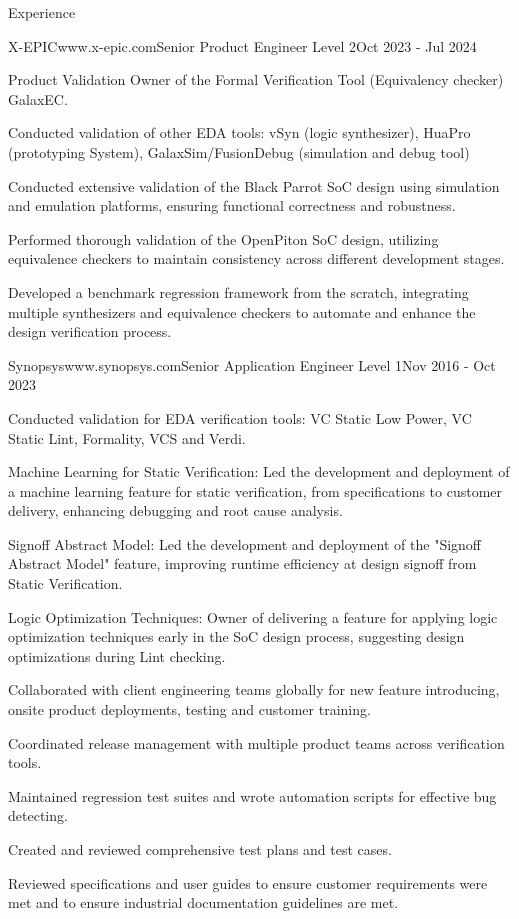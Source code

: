 \documentclass[
11pt, %
]{./assets/resume} %
\begin{document}
\begin{rSection}{Experience}
	\begin{rSubsectionX}{X-EPIC}{www.x-epic.com}{Senior Product Engineer Level 2}{Oct 2023 - Jul 2024}
		\item Product Validation Owner of the Formal Verification Tool (Equivalency checker) GalaxEC.
		\item Conducted validation of other EDA tools: vSyn (logic synthesizer), HuaPro (prototyping System), GalaxSim/FusionDebug (simulation and debug tool)
		\item Conducted extensive validation of the Black Parrot SoC design using simulation and emulation platforms, ensuring functional correctness and robustness.
		\item Performed thorough validation of the OpenPiton SoC design, utilizing equivalence checkers to maintain consistency across different development stages.
		\item Developed a benchmark regression framework from the scratch, integrating multiple synthesizers and equivalence checkers to automate and enhance the design verification process.
	\end{rSubsectionX}
	\begin{rSubsectionX}{Synopsys}{www.synopsys.com}{Senior Application Engineer Level 1}{Nov 2016 - Oct 2023}
		\item Conducted validation for EDA verification tools: VC Static Low Power, VC Static Lint, Formality, VCS and Verdi.
		\item Machine Learning for Static Verification: Led the development and deployment of a machine learning feature for static verification, from specifications to customer delivery, enhancing debugging and root cause analysis.
		\item Signoff Abstract Model: Led the development and deployment of the "Signoff Abstract Model" feature, improving runtime efficiency at design signoff from Static Verification.
		\item Logic Optimization Techniques: Owner of delivering a feature for applying logic optimization techniques early in the SoC design process, suggesting design optimizations during Lint checking.
		\item Collaborated with client engineering teams globally for new feature introducing, onsite product deployments, testing and customer training. 
		\item Coordinated release management with multiple product teams across verification tools. 
		\item Maintained regression test suites and wrote automation scripts for effective bug detecting.
		\item Created and reviewed comprehensive test plans and test cases.
		\item Reviewed specifications and user guides to ensure customer requirements were met and to ensure industrial documentation guidelines are met.
	\end{rSubsectionX}
\end{rSection}
\end{document}
